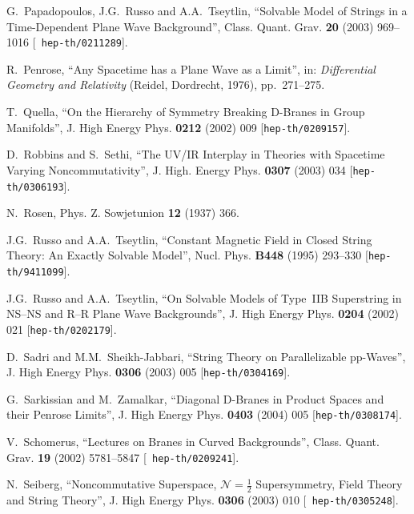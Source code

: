 \documentclass[11pt,a4paper]{article}
\begin{document}
\begin{thebibliography}{99}
 G.~Papadopoulos, J.G.~Russo and A.A.~Tseytlin,
  ``Solvable Model of Strings in a Time-Dependent Plane Wave
  Background'', Class. Quant. Grav. {\bf 20} (2003) 969--1016 [{\tt
    hep-th/0211289}].

 R.~Penrose, ``Any Spacetime has a Plane Wave as a
  Limit'', in: {\it Differential Geometry and Relativity} (Reidel,
  Dordrecht, 1976), pp.~271--275.

 T.~Quella, ``On the Hierarchy of Symmetry Breaking
  D-Branes in Group Manifolds'', J. High Energy Phys. {\bf 0212}
  (2002) 009 [{\tt hep-th/0209157}].

 D.~Robbins and S.~Sethi, ``The UV/IR Interplay in
  Theories with Spacetime Varying Noncommutativity'', J. High. Energy
  Phys. {\bf 0307} (2003) 034 [{\tt hep-th/0306193}].

 N.~Rosen, Phys. Z. Sowjetunion {\bf 12} (1937) 366.

 J.G.~Russo and A.A.~Tseytlin, ``Constant Magnetic Field
  in Closed String Theory: An Exactly Solvable Model'',
  Nucl. Phys. {\bf B448} (1995) 293--330 [{\tt hep-th/9411099}].

 J.G.~Russo and A.A.~Tseytlin, ``On Solvable Models of
  Type~IIB Superstring in NS--NS and R--R Plane Wave Backgrounds'',
  J. High Energy Phys. {\bf 0204} (2002) 021 [{\tt hep-th/0202179}].

 D.~Sadri and M.M.~Sheikh-Jabbari, ``String Theory on
  Parallelizable pp-Waves'', J. High Energy Phys. {\bf 0306} (2003)
  005 [{\tt hep-th/0304169}].

 G.~Sarkissian and M.~Zamalkar, ``Diagonal D-Branes in
  Product Spaces and their Penrose Limits'', J. High Energy Phys. {\bf
    0403} (2004) 005 [{\tt hep-th/0308174}].

 V.~Schomerus, ``Lectures on Branes in Curved
  Backgrounds'', Class. Quant. Grav. {\bf 19} (2002) 5781--5847 [{\tt
  hep-th/0209241}].

 N.~Seiberg, ``Noncommutative Superspace,
  $\mathcal{N}=\frac12$ Supersymmetry, Field Theory and String
  Theory'', J. High Energy Phys. {\bf 0306} (2003) 010 [{\tt
    hep-th/0305248}].


\end{thebibliography}
\end{document}

